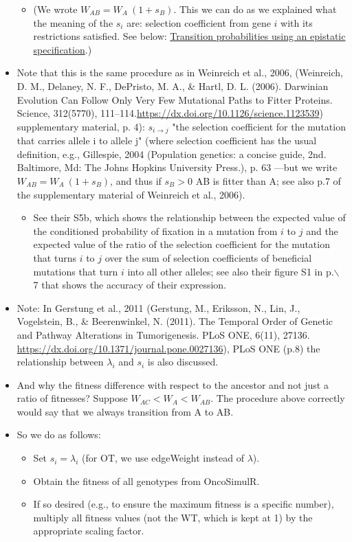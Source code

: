 \documentclass[11pt]{article}
\begin{document}
\begin{itemize}
\begin{itemize}
\item (We wrote \(W_{AB} = W_A \ (1 + s_B)\). This we can do as we explained what the meaning of the \(s_i\) are: selection coefficient from gene \(i\) with its restrictions satisfied. See below: \hyperref[sec:orge68f649]{Transition probabilities using an epistatic specification}.)
\end{itemize}

\item Note that this is the same procedure as in Weinreich et al., 2006, (Weinreich, D. M., Delaney, N. F., DePristo, M. A., \& Hartl, D. L. (2006). Darwinian Evolution Can Follow Only Very Few Mutational Paths to Fitter Proteins. Science, 312(5770), 111–114.\url{https://dx.doi.org/10.1126/science.1123539}) supplementary material, p. 4): \(s_{i \rightarrow j}\) "the selection coefficient for the mutation that carries allele i to allele j" (where selection coefficient has the usual definition, e.g., Gillespie, 2004 (Population genetics: a concise guide, 2nd. Baltimore, Md: The Johns Hopkins University Press.), p. 63 ---but we write \(W_{AB} = W_A \ (1 + s_B)\), and thus if \(s_B > 0\) AB is fitter than A; see also p.7 of the supplementary material of Weinreich et al., 2006).
\begin{itemize}
\item See their S5b, which shows the relationship between the expected value of the conditioned probability of fixation in a mutation from \(i\) to \(j\) and the expected value of the ratio of the selection coefficient for the mutation that turns \(i\) to \(j\) over the sum of selection coefficients of beneficial mutations that turn \(i\) into all other alleles; see also their figure S1 in p.$\backslash$ 7 that shows the accuracy of their expression.
\end{itemize}

\item Note: In Gerstung et al., 2011 (Gerstung, M., Eriksson, N., Lin, J., Vogelstein, B., \& Beerenwinkel, N. (2011). The Temporal Order of Genetic and Pathway Alterations in Tumorigenesis. PLoS ONE, 6(11), 27136. \url{https://dx.doi.org/10.1371/journal.pone.0027136}), PLoS ONE (p.8) the relationship between \(\lambda_i\) and \(s_i\) is also discussed.

\item And why the fitness difference with respect to the ancestor and not just a  ratio of fitnesses? Suppose \(W_{AC} < W_A < W_{AB}\). The procedure above  correctly would say that we always transition from A to AB.

\item So we do as follows:
\begin{itemize}
\item Set \(s_i = \lambda_i\) (for OT, we use edgeWeight instead of \(\lambda\)).
\item Obtain the fitness of all genotypes from OncoSimulR.
\item If so desired (e.g., to ensure the maximum fitness is a specific number),  multiply all fitness values (not the WT, which is kept at 1) by the appropriate scaling factor.
\end{itemize}
\end{itemize}
\end{document}
